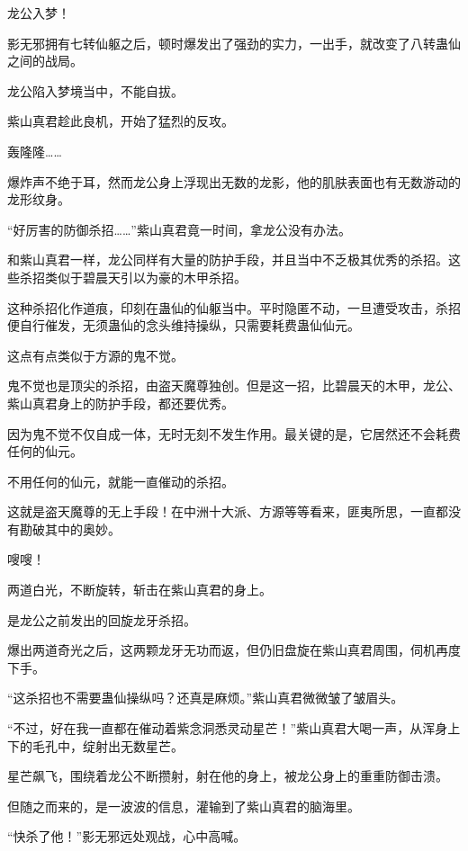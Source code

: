 
\begin{this_body}



龙公入梦！

影无邪拥有七转仙躯之后，顿时爆发出了强劲的实力，一出手，就改变了八转蛊仙之间的战局。

龙公陷入梦境当中，不能自拔。

紫山真君趁此良机，开始了猛烈的反攻。

轰隆隆……

爆炸声不绝于耳，然而龙公身上浮现出无数的龙影，他的肌肤表面也有无数游动的龙形纹身。

“好厉害的防御杀招……”紫山真君竟一时间，拿龙公没有办法。

和紫山真君一样，龙公同样有大量的防护手段，并且当中不乏极其优秀的杀招。这些杀招类似于碧晨天引以为豪的木甲杀招。

这种杀招化作道痕，印刻在蛊仙的仙躯当中。平时隐匿不动，一旦遭受攻击，杀招便自行催发，无须蛊仙的念头维持操纵，只需要耗费蛊仙仙元。

这点有点类似于方源的鬼不觉。

鬼不觉也是顶尖的杀招，由盗天魔尊独创。但是这一招，比碧晨天的木甲，龙公、紫山真君身上的防护手段，都还要优秀。

因为鬼不觉不仅自成一体，无时无刻不发生作用。最关键的是，它居然还不会耗费任何的仙元。

不用任何的仙元，就能一直催动的杀招。

这就是盗天魔尊的无上手段！在中洲十大派、方源等等看来，匪夷所思，一直都没有勘破其中的奥妙。

嗖嗖！

两道白光，不断旋转，斩击在紫山真君的身上。

是龙公之前发出的回旋龙牙杀招。

爆出两道奇光之后，这两颗龙牙无功而返，但仍旧盘旋在紫山真君周围，伺机再度下手。

“这杀招也不需要蛊仙操纵吗？还真是麻烦。”紫山真君微微皱了皱眉头。

“不过，好在我一直都在催动着紫念洞悉灵动星芒！”紫山真君大喝一声，从浑身上下的毛孔中，绽射出无数星芒。

星芒飙飞，围绕着龙公不断攒射，射在他的身上，被龙公身上的重重防御击溃。

但随之而来的，是一波波的信息，灌输到了紫山真君的脑海里。

“快杀了他！”影无邪远处观战，心中高喊。


\end{this_body}
